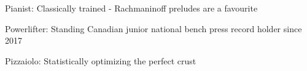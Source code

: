 



\begin{cvhonors}

  \begin{flushleft}\faMusic  \cvhonor 
    {Pianist:} %
    {Classically trained - Rachmaninoff preludes are a favourite } %
    {}
    {}\end{flushleft}
\begin{flushleft} {\faHeartO}  \cvhonor 
   {Powerlifter:} %
    {Standing Canadian junior national bench press record holder since 2017} %
 {}
    {}
    \end{flushleft}
\begin{flushleft}  \faFlask \cvhonor 
   {Pizzaiolo:} %
    {Statistically optimizing the perfect crust} %
 {}
    {}
    \end{flushleft}
\end{cvhonors}

